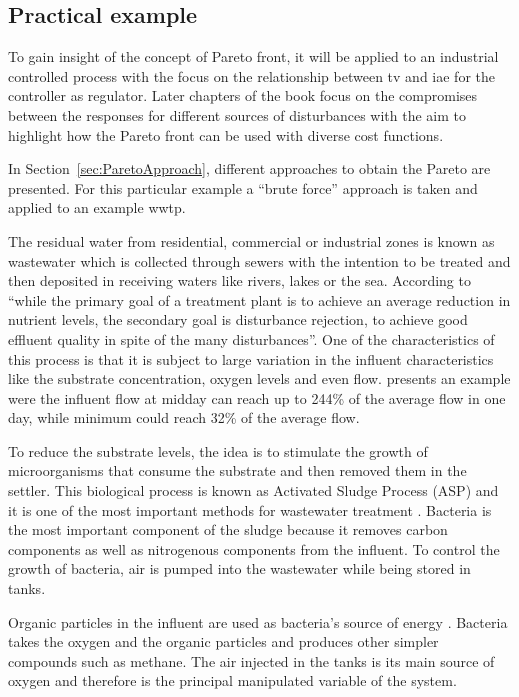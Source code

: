 \subsection{Practical example}
\label{sec:ParetoPractical}
To gain insight of the concept of Pareto front, it will be applied to an industrial controlled process with the focus on the relationship between \gls{tv} and \gls{iae} for the controller as regulator. Later chapters of the book focus on the compromises between the responses for different sources of disturbances with the aim to highlight how the Pareto front can be used with diverse cost functions.

In Section~\ref{sec:ParetoApproach}, different approaches to obtain the Pareto are presented. For this particular example a ``brute force'' approach is taken and applied to an example \gls{wwtp}.

The residual water from residential, commercial or industrial zones is known as wastewater which is collected through sewers with the intention to be treated and then deposited in receiving waters like rivers, lakes or the sea. According to \citet{Olsson1999} ``while the primary goal of a treatment plant is to achieve an average reduction in nutrient levels, the secondary goal is disturbance rejection, to achieve good effluent quality in spite of the many disturbances''. One of the characteristics of this process is that it is subject to large variation in the influent characteristics like the substrate concentration, oxygen levels and even flow. \citet{Henze1997} presents an example were the influent flow at midday can reach up to 244\% of the average flow in one day, while minimum could reach 32\% of the average flow.

To reduce the substrate levels, the idea is to stimulate the growth of microorganisms that consume the substrate and then removed them in the settler. This biological process is known as Activated Sludge Process (ASP) and it is one of the most important methods for wastewater treatment \citep{Henze1997}. Bacteria is the most important component of the sludge because it removes carbon components as well as nitrogenous components from the influent. To control the growth of bacteria, air is pumped into the wastewater while being stored in tanks.

Organic particles in the influent are used as bacteria's source of energy \citep{Jeppsson1996}. Bacteria takes the oxygen and the organic particles and produces other simpler compounds such as methane. The air injected in the tanks is its main source of oxygen and therefore is the principal manipulated variable of the system.

